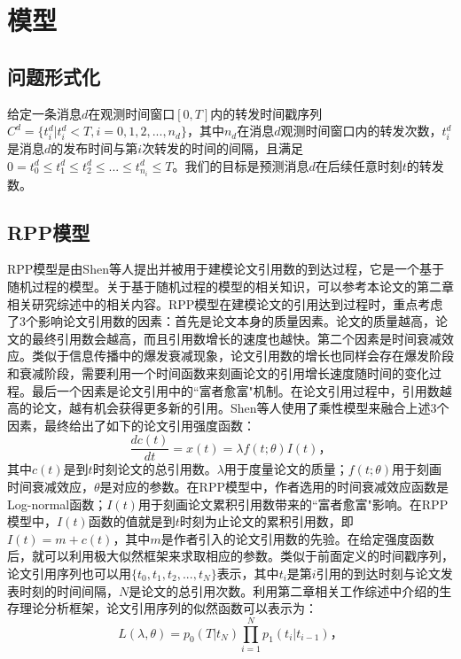 \section{模型}
\subsection{问题形式化}
给定一条消息$d$在观测时间窗口$[0,T]$内的转发时间戳序列$C^d=\{t_i^d|t_i^d<T,i=0,1,2,...,n_d\}$，其中$n_d$在消息$d$观测时间窗口内的转发次数，$t_i^d$是消息$d$的发布时间与第$i$次转发的时间的间隔，且满足$0=t_0^d \le t_1^d \le t_2^d \le...\le t_{n_i}^d \le T$。我们的目标是预测消息$d$在后续任意时刻$t$的转发数。

\subsection{RPP模型}
RPP模型是由Shen等人提出并被用于建模论文引用数的到达过程，它是一个基于随机过程的模型。关于基于随机过程的模型的相关知识，可以参考本论文的第二章相关研究综述中的相关内容。RPP模型在建模论文的引用达到过程时，重点考虑了3个影响论文引用数的因素：首先是论文本身的质量因素。论文的质量越高，论文的最终引用数会越高，而且引用数增长的速度也越快。第二个因素是时间衰减效应。类似于信息传播中的爆发衰减现象，论文引用数的增长也同样会存在爆发阶段和衰减阶段，需要利用一个时间函数来刻画论文的引用增长速度随时间的变化过程。最后一个因素是论文引用中的``富者愈富"机制\citep{jeong2003measuring,wang2008measuring}。在论文引用过程中，引用数越高的论文，越有机会获得更多新的引用。Shen等人使用了乘性模型来融合上述3个因素，最终给出了如下的论文引用强度函数：
\begin{equation}
\label{eq:rppDiff}
\frac{dc(t)}{dt}=x(t)=\lambda f(t;\theta) I(t)\text{，}
\end{equation}
其中$c(t)$是到$t$时刻论文的总引用数。$\lambda$用于度量论文的质量；$f(t;\theta)$用于刻画时间衰减效应，$\theta$是对应的参数。在RPP模型中，作者选用的时间衰减效应函数是Log-normal函数；$I(t)$用于刻画论文累积引用数带来的``富者愈富"影响。在RPP模型中，$I(t)$函数的值就是到$t$时刻为止论文的累积引用数，即$I(t)=m+c(t)$，其中$m$是作者引入的论文引用数的先验。在给定强度函数后，就可以利用极大似然框架来求取相应的参数。类似于前面定义的时间戳序列，论文引用序列也可以用$\{t_0,t_1,t_2,...,t_N\}$表示，其中$t_i$是第$i$引用的到达时刻与论文发表时刻的时间间隔，$N$是论文的总引用次数。利用第二章相关工作综述中介绍的生存理论分析框架，论文引用序列的似然函数可以表示为：
\begin{equation}
L(\lambda,\theta)=p_0(T|t_N)\prod_{i=1}^{N}p_1(t_i|t_{i-1})\text{，}
\end{equation}
